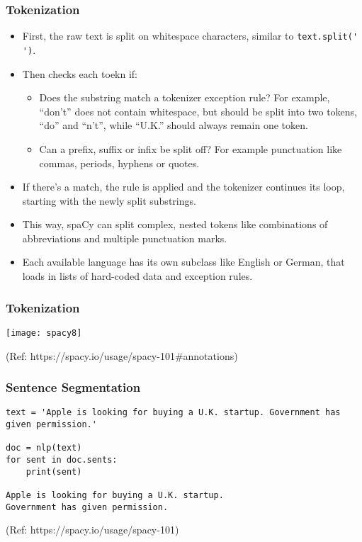 \begin{frame}[fragile]\frametitle{Tokenization}

\begin{itemize}
\item First, the raw text is split on whitespace characters, similar to \lstinline|text.split(' ')|.
\item Then checks each toekn if:
\begin{itemize}
\item Does the substring match a tokenizer exception rule? For example, “don’t” does not contain whitespace, but should be split into two tokens, “do” and “n’t”, while “U.K.” should always remain one token.
\item Can a prefix, suffix or infix be split off? For example punctuation like commas, periods, hyphens or quotes.
\end{itemize}

\item If there’s a match, the rule is applied and the tokenizer continues its loop, starting with the newly split substrings. 
\item This way, spaCy can split complex, nested tokens like combinations of abbreviations and multiple punctuation marks.
\item Each available language has its own subclass like English or German, that loads in lists of hard-coded data and exception rules.
\end{itemize}
\end{frame}

\begin{frame}[fragile]\frametitle{Tokenization}

\begin{center}
\texttt{[image: spacy8]}
\end{center}

{\tiny (Ref: https://spacy.io/usage/spacy-101\#annotations)}
\end{frame}


\begin{frame}[fragile]\frametitle{Sentence Segmentation}

\begin{lstlisting}
text = 'Apple is looking for buying a U.K. startup. Government has given permission.'

doc = nlp(text)
for sent in doc.sents:
    print(sent)
		
Apple is looking for buying a U.K. startup.
Government has given permission.
\end{lstlisting}
	
{\tiny (Ref: https://spacy.io/usage/spacy-101)}
\end{frame}


